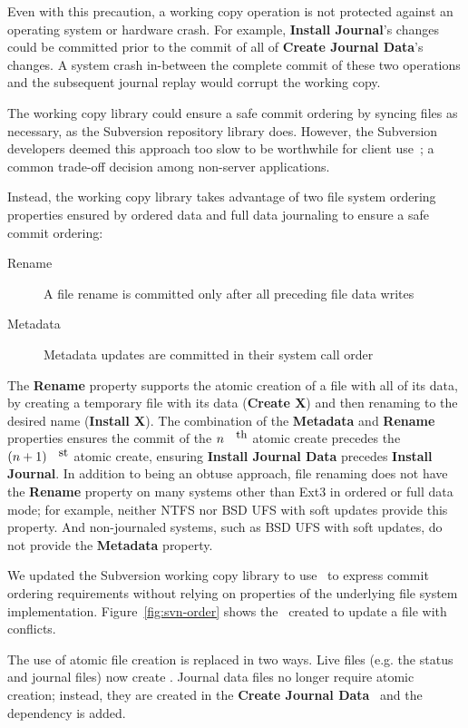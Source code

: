 Even with this precaution, a working copy operation is not protected
against an operating system or hardware crash.
%
For example, \textbf{Install Journal}'s changes could be committed
prior to the commit of all of \textbf{Create Journal Data}'s changes.
%
A system crash in-between the complete commit of these two operations
and the subsequent journal replay would corrupt the working copy.

The working copy library could ensure a safe commit ordering by
syncing files as necessary, as the Subversion repository library does.
%
However, the Subversion developers deemed this approach too slow to be
worthwhile for client use~\cite{svntradeoff}; a common trade-off
decision among non-server applications.

Instead, the working copy library takes advantage of two file system
ordering properties ensured by ordered data and full data journaling
to ensure a safe commit ordering:
\begin{description}
\item[Rename] A file rename is committed only after all preceding file
  data writes
\item[Metadata] Metadata updates are committed in their system call order
\end{description}
%
The \textbf{Rename} property supports the atomic creation of a file
with all of its data, by creating a temporary file with its data
(\textbf{Create X}) and then renaming to the desired name
(\textbf{Install X}).
%
The combination of the \textbf{Metadata} and \textbf{Rename}
properties ensures the commit of the $n^{\mbox{\small{th}}}$ atomic
create precedes the \((n+1)^{\mbox{\small{st}}}\) atomic create,
ensuring \textbf{Install Journal Data} precedes \textbf{Install
  Journal}.
%
In addition to being an obtuse approach, file renaming does not have
the \textbf{Rename} property on many systems other than Ext3 in
ordered or full data mode; for example, neither NTFS nor BSD UFS with
soft updates provide this property.
%
And non-journaled systems, such as BSD UFS with soft updates, do not
provide the \textbf{Metadata} property.

We updated the Subversion working copy library to use \opgroups\ to
express commit ordering requirements without relying on properties of the
underlying file system implementation.
%
Figure~\ref{fig:svn-order} shows the \opgroups\ created to update a
file with conflicts.

The use of atomic file creation is replaced in two ways.
%
Live files (e.g. the status and journal files) now create
.
%
Journal data files no longer require atomic creation; instead, they
are created in the \textbf{Create Journal Data} \opgroup\ and the
dependency is added.

